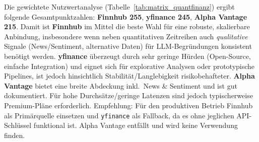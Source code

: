       Die gewichtete Nutzwertanalyse (Tabelle~\ref{tab:matrix_quantfinanz}) ergibt folgende Gesamtpunktzahlen: \textbf{Finnhub 255}, \textbf{yfinance 245}, \textbf{Alpha Vantage 215}.
      Damit ist \textbf{Finnhub} im Mittel die beste Wahl für eine robuste, skalierbare Anbindung, insbesondere wenn neben quantitativen Zeitreihen auch \emph{qualitative} Signale (News/Sentiment, alternative Daten) für \acs{LLM}-Begründungen konsistent benötigt werden.
      \textbf{yfinance} überzeugt durch sehr geringe Hürden (Open-Source, einfache Integration) und eignet sich für explorative Analysen oder prototypische Pipelines, ist jedoch hinsichtlich Stabilität/Langlebigkeit risikobehafteter.
      \textbf{Alpha Vantage} bietet eine breite Abdeckung inkl.\ News \& Sentiment und ist gut dokumentiert.
      Für hohe Durchsätze/geringe Latenzen sind jedoch typischerweise Premium-Pläne erforderlich.
      Empfehlung: Für den produktiven Betrieb Finnhub als Primärquelle einsetzen und \texttt{yfinance} als Fallback, da es ohne jeglichen API-Schlüssel funktional ist.
      Alpha Vantage entfällt und wird keine Verwendung finden.

